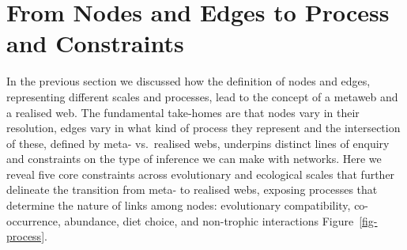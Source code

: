 \documentclass[
]{article}
\begin{document}
\section{From Nodes and Edges to Process and
Constraints}\label{sec-process}

In the previous section we discussed how the definition of nodes and
edges, representing different scales and processes, lead to the concept
of a metaweb and a realised web. The fundamental take-homes are that
nodes vary in their resolution, edges vary in what kind of process they
represent and the intersection of these, defined by meta- vs.~realised
webs, underpins distinct lines of enquiry and constraints on the type of
inference we can make with networks. Here we reveal five core
constraints across evolutionary and ecological scales that further
delineate the transition from meta- to realised webs, exposing processes
that determine the nature of links among nodes: evolutionary
compatibility, co-occurrence, abundance, diet choice, and non-trophic
interactions Figure~\ref{fig-process}.
\end{document}
